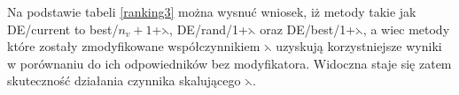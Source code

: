 \begin{table}[h!]
\begin{center}
\caption{Ranking metod mutacji na podstawie średniej wartości błędu względnego funkcji celu}
\label{ranking3}
\end{center}
\end{table}

Na podstawie tabeli \ref{ranking3} można wysnuć wniosek, iż metody takie jak  DE/current to best/$n_{v}+1$+$\leftthreetimes$, DE/rand/1+$\leftthreetimes$ oraz  DE/best/1+$\leftthreetimes$, a wiec metody które zostały zmodyfikowane współczynnikiem $\leftthreetimes$ uzyskują korzystniejsze wyniki w porównaniu do ich odpowiedników bez modyfikatora. Widoczna staje się zatem skuteczność działania czynnika skalującego $\leftthreetimes$.














